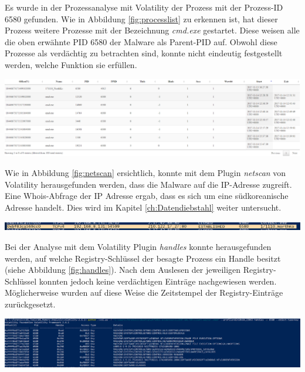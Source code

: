 Es wurde in der Prozessanalyse mit Volatility der Prozess  mit der Prozess-ID 6580 gefunden.
Wie in Abbildung \ref{fig:processlist} zu erkennen ist, hat dieser Prozess weitere Prozesse mit der Bezeichnung \textit{cmd.exe} gestartet.
Diese weisen alle die oben erwähnte PID 6580 der Malware als Parent-PID auf.
Obwohl diese Prozesse als verdächtig zu betrachten sind, konnte nicht eindeutig festgestellt werden, welche Funktion sie erfüllen.

\begin{center}
	\includegraphics[width=15.8cm]{figures/processlist.png}
	\label{fig:processlist}
\end{center}

\newpage
Wie in Abbildung \ref{fig:netscan} ersichtlich, konnte mit dem Plugin \textit{netscan} von Volatility herausgefunden werden, dass die Malware auf die IP-Adresse  zugreift.
Eine Whois-Abfrage der IP Adresse ergab, dass es sich um eine südkoreanische Adresse handelt.
Dies wird im Kapitel \ref{ch:Datendiebstahl} weiter untersucht.

\begin{center}
	\includegraphics[width=15.8cm]{figures/netscan.png}
	\label{fig:netscan}
\end{center}

Bei der Analyse mit dem Volatility Plugin \textit{handles} konnte herausgefunden werden, auf welche Registry-Schlüssel der besagte Prozess ein Handle besitzt (siehe Abbildung \ref{fig:handles}).
Nach dem Auslesen der jeweiligen Registry-Schlüssel konnten jedoch keine verdächtigen Einträge nachgewiesen werden.
Möglicherweise wurden auf diese Weise die Zeitstempel der Registry-Einträge zurückgesetzt.

\begin{center}
	\includegraphics[width=15.8cm]{figures/volatility-handles.png}
	\label{fig:handles}
\end{center}

